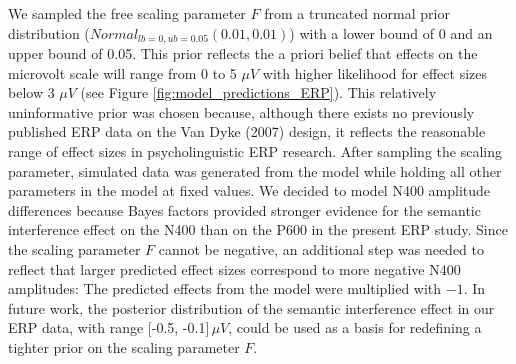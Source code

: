 \documentclass[review,preprint,12pt,authoryear,floatsintext]{elsarticle}
\begin{document}
{We sampled the free scaling parameter $F$ from a truncated normal prior distribution ($Normal_{lb=0,ub=0.05}(0.01, 0.01)$) with a lower bound of 0 and an upper bound of 0.05. This prior reflects the a priori belief that effects on the microvolt scale will range from 0 to 5 $\mu V$ with higher likelihood for effect sizes below 3 $\mu V$ (see Figure \ref{fig:model_predictions_ERP}). This relatively uninformative prior was chosen because, although there exists no previously published ERP data on the Van Dyke (2007) design, it reflects the reasonable range of effect sizes in psycholinguistic ERP research. After sampling the scaling parameter, simulated data was generated from the model while holding all other parameters in the model at fixed values. We decided to model N400 amplitude differences because Bayes factors provided stronger evidence for the semantic interference effect on the N400 than on the P600 in the present ERP study. Since the scaling parameter $F$ cannot be negative, an additional step was needed to reflect that larger predicted effect sizes correspond to more negative N400 amplitudes: The predicted effects from the model were multiplied with $-1$. In future work, the posterior distribution of the semantic interference effect in our ERP data, with range [-0.5, -0.1]\,$\mu V$, could be used as a basis for redefining a tighter prior on the scaling parameter $F$.

}
\end{document}
